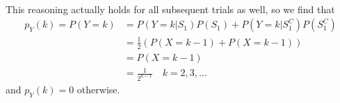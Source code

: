 \begin{exercise}[BH.3.2]
\begin{solution}
\begin{enumerate}
\begin{align*}
		\end{align*}
		This reasoning actually holds for all subsequent trials as well, so we find that 
		\begin{align*}
			p_Y(k)=P(Y=k) &= P(Y=k|S_{1})P(S_{1}) + P(Y=k|S_{1}^C)P(S_{1}^C)\\
			& = \frac{1}{2}(P(X=k-1) + P(X=k-1))\\
			& = P(X=k-1)\\
			&= \frac{1}{2^{k-1}}\quad k = 2,3,\ldots		
		\end{align*}
		and $p_{Y}(k)=0$ otherwise.
	\end{enumerate}
\end{solution}
\end{exercise}


